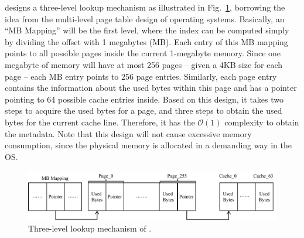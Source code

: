 \MP{} designs a three-level lookup mechanism as illustrated in Fig.~\ref{fig:lookup}, borrowing the idea from the multi-level page table design of operating systems. Basically, an ``MB Mapping'' will be the first level, where the index can be computed simply by dividing the offset with 1 megabytes (MB). Each entry of this MB mapping points to all possible pages inside the current 1-megabyte memory. Since one megabyte of memory will have at most 256 pages -- given a 4KB size for each page -- each MB entry points to 256 page entries. Similarly, each page entry contains the information about the used bytes within this page and has a pointer pointing to 64 possible cache entries inside. Based on this design, it takes two steps to acquire the used bytes for a page, and three steps to obtain the used bytes for the current cache line. Therefore, it has the $\mathcal{O}(1)$ 
complexity to obtain the metadata. Note that this design will not cause excessive memory consumption, since the physical memory is allocated in a demanding way in the OS. 
 
          
\begin{figure}[!h]
\centering
\includegraphics[width=0.9\columnwidth]{figures/lookup}
\caption{Three-level lookup mechanism of \MP{}.\label{fig:lookup}}
\end{figure}


